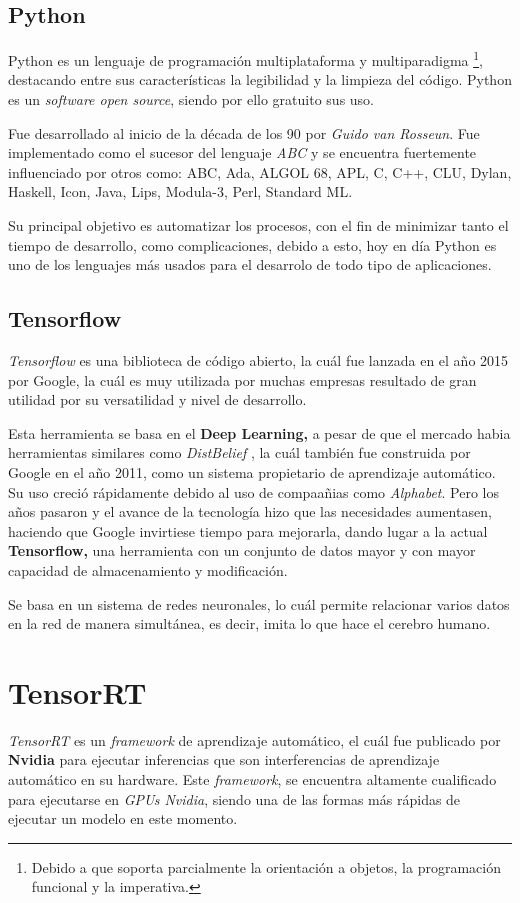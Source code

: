 \subsection{Python}
Python es un lenguaje de programación multiplataforma y multiparadigma \footnote{Debido a que soporta parcialmente la orientación a objetos, la programación funcional y la imperativa.}, destacando entre sus características la legibilidad y la limpieza del código. Python es un \textit{software open source}, siendo por ello gratuito sus uso.

Fue desarrollado al inicio de la década de los 90 por \textit{Guido van Rosseun}. Fue implementado como el sucesor del lenguaje \textit{ABC} y se encuentra fuertemente influenciado por otros como: ABC, Ada, ALGOL 68, APL, C, C++, CLU, Dylan, Haskell, Icon, Java,
Lips, Modula-3, Perl, Standard ML.

Su principal objetivo es automatizar los procesos, con el fin de minimizar tanto el tiempo de desarrollo, como complicaciones, debido a esto, hoy en día Python es uno de los lenguajes más usados para el desarrolo de todo tipo de aplicaciones.

\subsection{Tensorflow}
\textit{Tensorflow} \cite{tensorflow} es una biblioteca de código abierto, la cuál fue lanzada en el año 2015 por Google, la cuál es muy utilizada por muchas empresas resultado de gran utilidad por su versatilidad y nivel de desarrollo.

Esta herramienta se basa en el \textbf{Deep Learning,} a pesar de que el mercado habia herramientas similares como \textit{DistBelief} \cite{distBelief}, la cuál también fue construida por Google en el año 2011, como un sistema propietario de aprendizaje automático. Su uso creció rápidamente debido al uso de compaañias como \textit{Alphabet}. Pero los años pasaron y el avance de la tecnología 
hizo que las necesidades aumentasen, haciendo que Google invirtiese tiempo para mejorarla, dando lugar a la actual \textbf{Tensorflow,} una herramienta con un conjunto de datos mayor y con mayor capacidad de almacenamiento y modificación.

Se basa en un sistema de redes neuronales, lo cuál permite relacionar varios datos en la red de manera simultánea, es decir, imita lo que hace el cerebro humano.

\section{TensorRT}
\textit{TensorRT} \cite{tensorrt} es un \textit{framework} de aprendizaje automático, el cuál fue publicado por \textbf{Nvidia} para ejecutar inferencias que son interferencias de aprendizaje automático en su hardware. Este \textit{framework}, se encuentra altamente cualificado para ejecutarse en \textit{GPUs Nvidia}, siendo una de las formas más rápidas de ejecutar un modelo en este momento.

